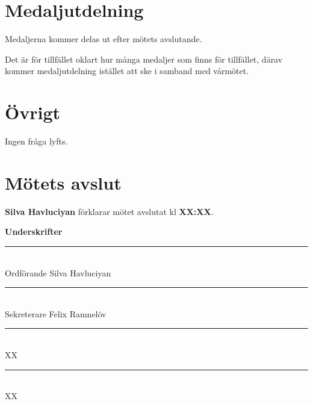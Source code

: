 \documentclass{datateknologsektionen-document}
\begin{document}
\section{Medaljutdelning}
Medaljerna kommer delas ut efter mötets avslutande.

Det är för tillfället oklart hur många medaljer som finns för tillfället, därav kommer medaljutdelning istället att ske i samband med vårmötet.

\section{Övrigt}

Ingen fråga lyfts.


\section{Mötets avslut}


\textbf{Silva Havluciyan} förklarar mötet avslutat kl \textbf{XX:XX}.


\pagebreak
{\Large\bfseries Underskrifter}

\vspace*{1.2cm}
\noindent\rule{8cm}{1pt}\\
Ordförande Silva Havluciyan

\vspace*{1.2cm}
\noindent\rule{8cm}{1pt}\\
Sekreterare Felix Ramnelöv

\vspace*{1.2cm}
\noindent\rule{8cm}{1pt}\\
XX

\vspace*{1.2cm}
\noindent\rule{8cm}{1pt}\\
XX
\end{document}
